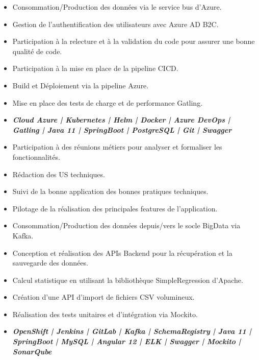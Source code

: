
\begin{itemize}
\item Consommation/Production des données via le service bus d’Azure.
\item Gestion de l’authentification des utilisateurs avec Azure AD B2C.
\item Participation à la relecture et à la validation du code pour assurer une bonne qualité de code.
\item Participation à la mise en place de la pipeline CICD.
\item Build et Déploiement via la pipeline Azure.
\item Mise en place des tests de charge et de performance Gatling.
\item \textbf {\emph{Cloud Azure | Kubernetes | Helm | Docker | Azure DevOps | Gatling  | Java 11 | SpringBoot | PostgreSQL | Git  | Swagger}}
\end{itemize}

\divider

\begin{itemize}
\item Participation à des réunions métiers pour analyser et formaliser les fonctionnalités.
\item Rédaction des US techniques.
\item Suivi de la bonne application des bonnes pratiques techniques.
\item Pilotage de la réalisation des principales features de l’application.
\item Consommation/Production des données depuis/vers le socle BigData via Kafka.
\item Conception et réalisation des APIs Backend pour la récupération et la sauvegarde des données.
\item Calcul statistique en utilisant la bibliothèque SimpleRegression d’Apache.
\item Création d'une API d'import de fichiers CSV volumineux.
\item Réalisation des tests unitaires et d’intégration via Mockito.
\item \textbf {\emph{OpenShift | Jenkins | GitLab | Kafka | SchemaRegistry | Java 11 | SpringBoot | MySQL | Angular 12 | ELK | Swagger | Mockito | SonarQube}}

\end{itemize}

